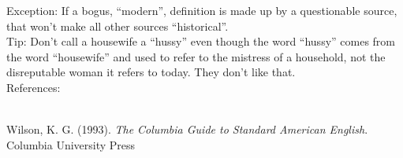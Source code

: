 \documentclass[a4paper,12pt,single,pdftex]{scrbook}
\begin{document}
    
      Exception: If a bogus, “modern”, definition is made up by a questionable source, that won’t make all other sources “historical”.
    \\

    
      Tip: Don’t call a housewife a “hussy” even though the word “hussy” comes from the word “housewife” and used to refer to the mistress of a household, not the disreputable woman it refers to today. They don’t like that.
    \\

    References:

    
      
        
      \\

      
        
          Wilson, K. G. (1993). {\it The Columbia Guide to Standard American English}. Columbia University Press
        
      
    
\end{document}
